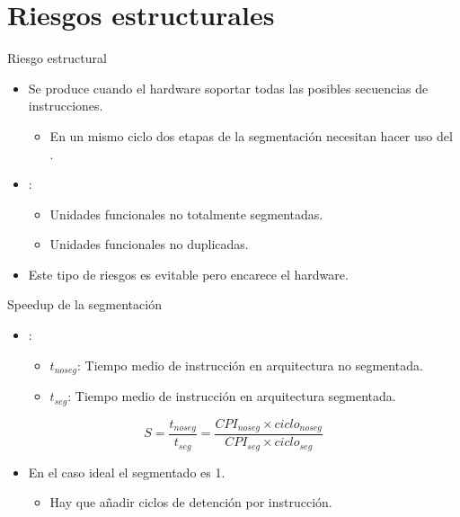 \section{Riesgos estructurales}

\begin{frame}[t]{Riesgo estructural}
\begin{itemize}
  \item  Se produce cuando el hardware  soportar
         todas las posibles secuencias de instrucciones.
    \begin{itemize} 
      \item En un mismo ciclo dos etapas de la segmentación
            necesitan hacer uso del .
    \end{itemize}

  \item {}:
    \begin{itemize}
      \item Unidades funcionales no totalmente segmentadas.
      \item Unidades funcionales no duplicadas.
    \end{itemize}

  \item Este tipo de riesgos es evitable pero encarece el
        hardware.
\end{itemize}
\end{frame}

\begin{frame}[t]{Speedup de la segmentación}
\begin{itemize}
  \item {}:
    \begin{itemize}
      \item $t_{noseg}$: Tiempo medio de instrucción en arquitectura no segmentada.
      \item $t_{seg}$: Tiempo medio de instrucción en arquitectura segmentada.
    \end{itemize}
\end{itemize}
\[
S = 
\frac{t_{noseg}}{t_{seg}} =
\frac{CPI_{noseg} \times ciclo_{noseg}}{CPI_{seg} \times ciclo_{seg}}
\]
\begin{itemize}
  \item En el caso ideal el  segmentado es 1.
    \begin{itemize}
      \item Hay que añadir ciclos de detención por instrucción.
    \end{itemize}
\end{itemize}
\end{frame}

